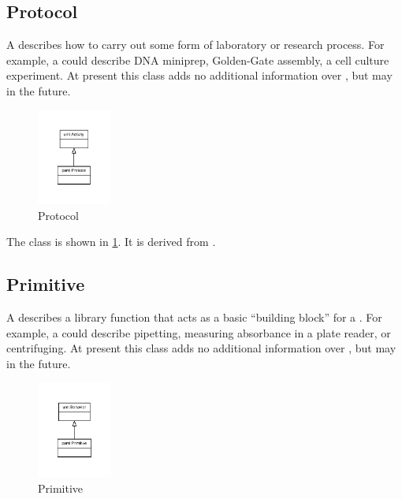 %
\normalsize%
\subsection{Protocol}%
\label{sec:labop:Protocol}%
A  describes how to carry out some form of laboratory or research process.
              For example, a  could describe DNA miniprep, Golden-Gate assembly, a cell culture experiment.
              At present this class adds no additional information over , but may in the future.%
\newline%
\linebreak%


\begin{figure}[h!]%
\centering%
\includegraphics[width=0.21595744680851064\textwidth]{labop_classes/Protocol_abstraction_hierarchy.pdf}%
\caption{Protocol}%
\label{fig:Protocol}%
\end{figure}

%
The  class is shown in \ref{fig:Protocol}. It is derived from .%
%
\subsection{Primitive}%
\label{sec:labop:Primitive}%
A  describes a library function that acts as a basic ``building block'' for a .
              For example, a  could describe pipetting, measuring absorbance in a plate reader, or centrifuging.
              At present this class adds no additional information over , but may in the future.%
\newline%
\linebreak%


\begin{figure}[h!]%
\centering%
\includegraphics[width=0.21893617021276596\textwidth]{labop_classes/Primitive_abstraction_hierarchy.pdf}%
\caption{Primitive}%
\label{fig:Primitive}%
\end{figure}


